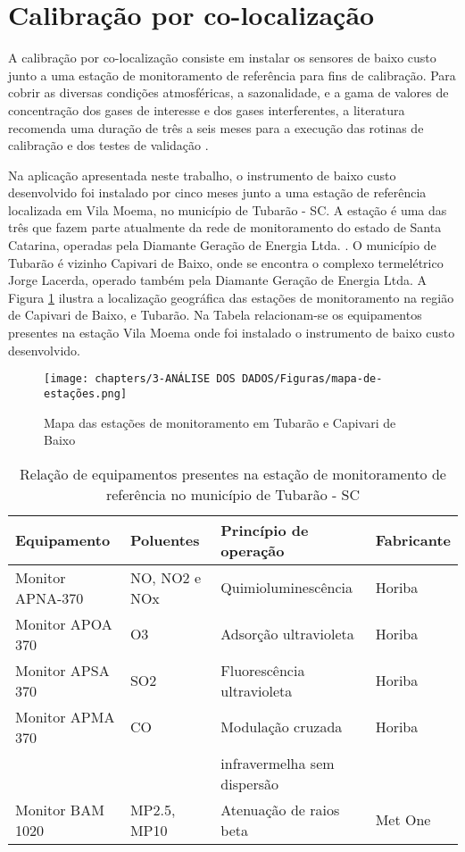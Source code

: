 \section{Calibração por co-localização}

A calibração por co-localização consiste em instalar os sensores de baixo custo junto a uma estação de monitoramento de referência para fins de calibração. Para cobrir as diversas condições atmosféricas, a sazonalidade, e a gama de valores de concentração dos gases de interesse e dos gases interferentes, a literatura recomenda uma duração de três a seis meses para a execução das rotinas de calibração e dos testes de validação \cite{Spinelle2013ProtocolPollution}.

Na aplicação apresentada neste trabalho, o instrumento de baixo custo desenvolvido foi instalado por cinco meses junto a uma estação de referência localizada em Vila Moema, no município de Tubarão - SC. A estação é uma das três que fazem parte atualmente da rede de monitoramento do estado de Santa Catarina, operadas pela Diamante Geração de Energia Ltda. \cite{IMASC24}. O município de Tubarão é vizinho Capivari de Baixo, onde se encontra o complexo termelétrico Jorge Lacerda, operado também pela Diamante Geração de Energia Ltda. A Figura \ref{fig:stations-map} ilustra a localização geográfica das estações de monitoramento na região de Capivari de Baixo, e Tubarão. Na Tabela relacionam-se os equipamentos presentes na estação Vila Moema onde foi instalado o instrumento de baixo custo desenvolvido.

\begin{figure}[h]
    \centering
    \caption{Mapa das estações de monitoramento em Tubarão e Capivari de Baixo}
    \texttt{[image: chapters/3-ANÁLISE DOS DADOS/Figuras/mapa-de-estações.png]}
    \label{fig:stations-map}
\end{figure}

\begin{table}[!ht]
    \centering
    \caption{Relação de equipamentos presentes na estação de monitoramento de referência no município de Tubarão - SC}
    \begin{tabular}{l|l|l|l}
        \textbf{Equipamento} & \textbf{Poluentes} & \textbf{Princípio de operação} & \textbf{Fabricante} \\
        \hline
        Monitor APNA-370 & NO, NO2 e NOx & Quimioluminescência & Horiba \\
        Monitor APOA 370 & O3 & Adsorção ultravioleta & Horiba \\
        Monitor APSA 370 & SO2 & Fluorescência ultravioleta & Horiba \\
        Monitor APMA 370 & CO & Modulação cruzada & Horiba \\
         & & infravermelha sem dispersão & \\
        Monitor BAM 1020 & MP2.5, MP10 & Atenuação de raios beta & Met One \\
        \hline
    \end{tabular}
    \label{tab:reference-equipments}
\end{table}

